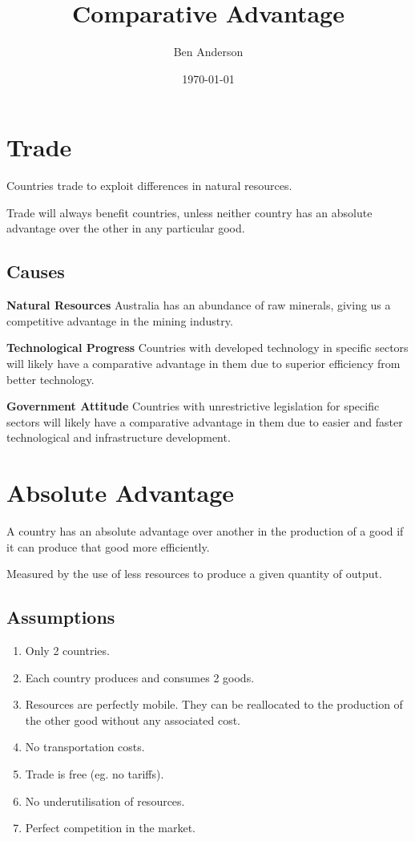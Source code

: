 \documentclass[a4paper,11pt]{article}
\begin{document}
\title{Comparative Advantage}
\author{Ben Anderson}
\date{\today}
\maketitle
\pagebreak

\tableofcontents
\pagebreak



\section{Trade}

Countries trade to exploit differences in natural resources.

Trade will always benefit countries, unless neither country has an absolute
advantage over the other in any particular good.


\subsection{Causes}

\textbf{Natural Resources} \quad Australia has an abundance of raw minerals,
giving us a competitive advantage in the mining industry.

\textbf{Technological Progress} \quad Countries with developed technology in
specific sectors will likely have a comparative advantage in them due to
superior efficiency from better technology.

\textbf{Government Attitude} \quad Countries with unrestrictive legislation for
specific sectors will likely have a comparative advantage in them due to easier
and faster technological and infrastructure development.




\section{Absolute Advantage}

A country has an absolute advantage over another in the production of a good if
it can produce that good more efficiently.

Measured by the use of less resources to produce a given quantity of output.


\subsection{Assumptions}

\begin{enumerate}
\item Only 2 countries.
\item Each country produces and consumes 2 goods.
\item Resources are perfectly mobile. They can be reallocated to the production
of the other good without any associated cost.
\item No transportation costs.
\item Trade is free (eg. no tariffs).
\item No underutilisation of resources.
\item Perfect competition in the market.
\end{enumerate}
\end{document}
